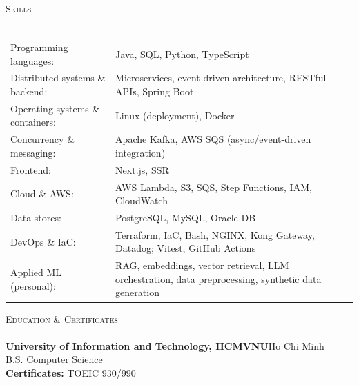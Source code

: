 \documentclass[a4paper]{article}
\newcommand{\lineunder} {
 \vspace*{-8pt} \\
 \hspace*{-18pt} \hrulefill \\
}
\newcommand{\header} [1] {
 {\hspace*{-18pt}\vspace*{6pt} \textsc{#1}}
 \vspace*{-6pt} \lineunder
}
\begin{document}
\header{Skills}
\vspace{0.5mm}
\begin{tabular}{@{}l>{\raggedright\arraybackslash}p{\dimexpr\linewidth-5.5cm\relax}@{}}
      Programming languages:           & Java, SQL, Python, TypeScript                                                                       \\
      Distributed systems \& backend:  & Microservices, event-driven architecture, RESTful APIs, Spring Boot                                 \\
      Operating systems \& containers: & Linux (deployment), Docker                                                                          \\
      Concurrency \& messaging:        & Apache Kafka, AWS SQS (async/event-driven integration)                                              \\
      Frontend:                        & Next.js, SSR                                                                                        \\
      Cloud \& AWS:                    & AWS Lambda, S3, SQS, Step Functions, IAM, CloudWatch                                                \\
      Data stores:                     & PostgreSQL, MySQL, Oracle DB                                                                        \\
      DevOps \& IaC:                   & Terraform, IaC, Bash, NGINX, Kong Gateway, Datadog; Vitest, GitHub Actions                        \\
      Applied ML (personal):           & RAG, embeddings, vector retrieval, LLM orchestration, data preprocessing, synthetic data generation \\
\end{tabular}

\vspace{1mm}
\header{Education \& Certificates}
\vspace{0.5mm}
\textbf{University of Information and Technology, HCMVNU}\hfill Ho Chi Minh\\
B.S. Computer Science\\
\vspace{1.5mm}
\textbf{Certificates:} TOEIC 930/990\\
\end{document}
